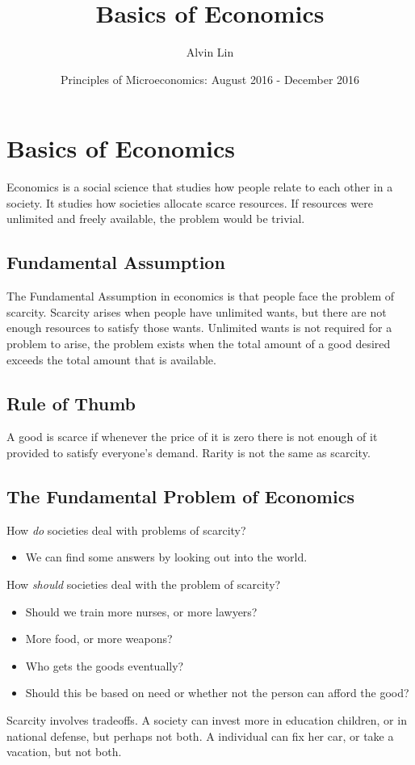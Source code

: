 \documentclass{article}
\title{Basics of Economics}
\author{Alvin Lin}
\date{Principles of Microeconomics: August 2016 - December 2016}
\begin{document}
\maketitle

\section*{Basics of Economics}
Economics is a social science that studies how people relate to each other in
a society. It studies how societies allocate scarce resources. If resources were
unlimited and freely available, the problem would be trivial.

\subsection*{Fundamental Assumption}
The Fundamental Assumption in economics is that people face the problem
of scarcity. Scarcity arises when people have unlimited wants, but there are not
enough resources to satisfy those wants. Unlimited wants is not required for
a problem to arise, the problem exists when the total amount of a good desired
exceeds the total amount that is available.

\subsection*{Rule of Thumb}
A good is scarce if whenever the price of it is zero there is not enough of it
provided to satisfy everyone's demand. Rarity is not the same as scarcity.

\subsection*{The Fundamental Problem of Economics}
How \textit{do} societies deal with problems of scarcity?
\begin{itemize}
  \item We can find some answers by looking out into the world.
\end{itemize}
How \textit{should} societies deal with the problem of scarcity?
\begin{itemize}
  \item Should we train more nurses, or more lawyers?
  \item More food, or more weapons?
  \item Who gets the goods eventually?
  \item Should this be based on need or whether not the person can afford the
        good?
\end{itemize}
Scarcity involves tradeoffs. A society can invest more in education children,
or in national defense, but perhaps not both. A individual can fix her car, or
take a vacation, but not both.
\end{document}
